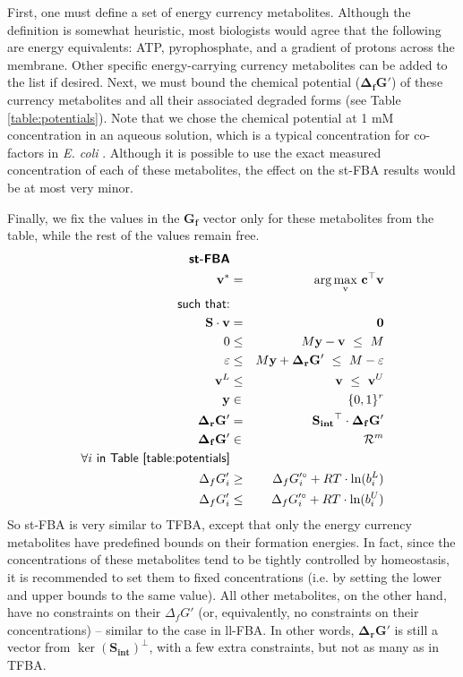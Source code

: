 \documentclass[twocolumn]{article}
\newcommand{\Sint}{\mathbf{S_{int}}}
\begin{document}
First, one must define a set of energy currency metabolites. Although the definition is somewhat heuristic, most biologists would agree that the following are energy equivalents: ATP, pyrophosphate, and a gradient of protons across the membrane. Other specific energy-carrying currency metabolites can be added to the list if desired. Next, we must bound the chemical potential ($\mathbf{\Delta_f G'}$) of these currency metabolites and all their associated degraded forms (see Table \ref{table:potentials}). Note that we chose the chemical potential at 1 mM concentration in an aqueous solution, which is a typical concentration for co-factors in \emph{E. coli} \cite{Bennett2009-rm}. Although it is possible to use the exact measured concentration of each of these metabolites, the effect on the st-FBA results would be at most very minor. 

Finally, we fix the values in the $\mathbf{G_f}$ vector only for these metabolites from the table, while the rest of the values remain free.
\begin{eqnarray}
\textsf{\textbf{st-FBA}}\nonumber\\
\mathbf{v^*} &=& \mathrm{arg\max_v} {~\mathbf{c}^\top\mathbf{v}}\nonumber\\
\textsf{such that:} && \nonumber\\
\mathbf{S} \cdot \mathbf{v} &=& \mathbf{0} \label{eq:stfba1}\\
0 &\leq& M \mathbf{y} - \mathbf{v} ~\leq~ M \label{eq:stfba2}\\
\varepsilon &\leq& M \mathbf{y} + \mathbf{\Delta_r G'} ~\leq~ M - \varepsilon\label{eq:stfba3}\\
\mathbf{v}^L &\leq& \mathbf{v} ~\leq~ \mathbf{v}^U \label{eq:stfba4}\\
\mathbf{y} &\in& \{0, 1\}^r \label{eq:stfba5}\\
\mathbf{\Delta_r G'} &=& \Sint^\top \cdot \mathbf{\Delta_f G'}\\
\mathbf{\Delta_f G'} &\in& \mathcal{R}^{m}\\
\forall i~\textsf{in Table \ref{table:potentials}}\nonumber\\
\Delta_f G'_i &\geq& \Delta_f G'^\circ_i + RT \cdot \ln(b^L_i) \\
\Delta_f G'_i &\leq& \Delta_f G'^\circ_i + RT \cdot \ln(b^U_i) 
\end{eqnarray}
So st-FBA is very similar to TFBA, except that only the energy currency metabolites have predefined bounds on their formation energies. In fact, since the concentrations of these metabolites tend to be tightly controlled by homeostasis, it is recommended to set them to fixed concentrations (i.e. by setting the lower and upper bounds to the same value). All other metabolites, on the other hand, have no constraints on their $\Delta_f G'$ (or, equivalently, no constraints on their concentrations) -- similar to the case in ll-FBA. In other words, $\mathbf{\Delta_r G'}$ is still a vector from $\ker{(\mathbf{S_{int}})}^\perp$, with a few extra constraints, but not as many as in TFBA.
\end{document}
